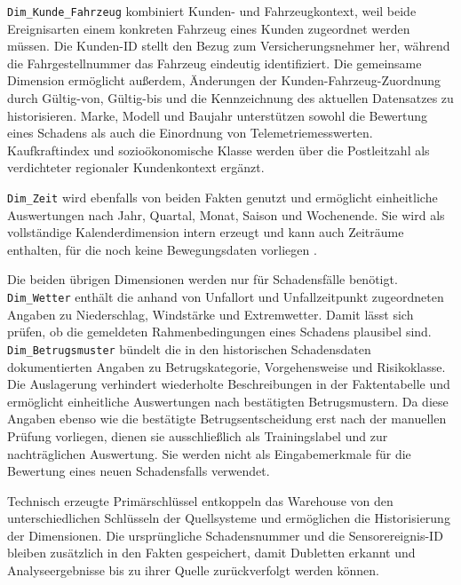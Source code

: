 \texttt{Dim\_Kunde\_Fahrzeug} kombiniert Kunden- und Fahrzeugkontext, weil
beide Ereignisarten einem konkreten Fahrzeug eines Kunden zugeordnet werden
müssen. Die Kunden-ID stellt den Bezug zum Versicherungsnehmer her, während
die Fahrgestellnummer das Fahrzeug eindeutig identifiziert. Die gemeinsame
Dimension ermöglicht außerdem, Änderungen der Kunden-Fahrzeug-Zuordnung durch
Gültig-von, Gültig-bis und die Kennzeichnung des aktuellen Datensatzes zu
historisieren. Marke, Modell und Baujahr unterstützen sowohl die Bewertung
eines Schadens als auch die Einordnung von Telemetriemesswerten. Kaufkraftindex
und sozioökonomische Klasse werden über die Postleitzahl als verdichteter
regionaler Kundenkontext ergänzt.

\texttt{Dim\_Zeit} wird ebenfalls von beiden Fakten genutzt und ermöglicht
einheitliche Auswertungen nach Jahr, Quartal, Monat, Saison und Wochenende. Sie
wird als vollständige Kalenderdimension intern erzeugt und kann auch Zeiträume
enthalten, für die noch keine Bewegungsdaten vorliegen
\citep[S.~40]{gerlachSchulz2026}.

Die beiden übrigen Dimensionen werden nur für Schadensfälle benötigt.
\texttt{Dim\_Wetter} enthält die anhand von Unfallort und Unfallzeitpunkt
zugeordneten Angaben zu Niederschlag, Windstärke und Extremwetter. Damit lässt
sich prüfen, ob die gemeldeten Rahmenbedingungen eines Schadens plausibel
sind. \texttt{Dim\_Betrugsmuster} bündelt die in den historischen
Schadensdaten dokumentierten Angaben zu Betrugskategorie, Vorgehensweise und
Risikoklasse. Die Auslagerung verhindert wiederholte Beschreibungen in der
Faktentabelle und ermöglicht einheitliche Auswertungen nach bestätigten
Betrugsmustern. Da diese Angaben ebenso wie die bestätigte Betrugsentscheidung
erst nach der manuellen Prüfung vorliegen, dienen sie ausschließlich als
Trainingslabel und zur nachträglichen Auswertung. Sie werden nicht als
Eingabemerkmale für die Bewertung eines neuen Schadensfalls verwendet.

Technisch erzeugte Primärschlüssel entkoppeln das Warehouse von den
unterschiedlichen Schlüsseln der Quellsysteme und ermöglichen die
Historisierung der Dimensionen. Die ursprüngliche Schadensnummer und die
Sensorereignis-ID bleiben zusätzlich in den Fakten gespeichert, damit
Dubletten erkannt und Analyseergebnisse bis zu ihrer Quelle zurückverfolgt
werden können.
